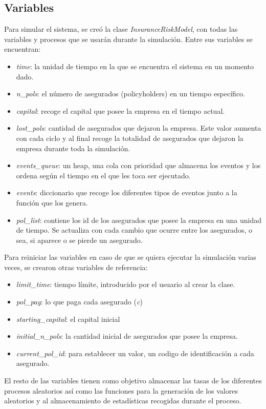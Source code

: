 \documentclass[spanish]{article}
\begin{document}
\subsection{Variables}
Para simular el sistema, se cre\'o la clase \textit{InsuranceRiskModel}, con todas las variables y procesos que se usar\'an durante la simulaci\'on.
Entre sus variables se encuentran:
\begin{itemize}
    \item \textit{time}: la unidad de tiempo en la que se encuentra el sistema en un momento dado.
    \item \textit{n\_pols}: el n\'umero de asegurados (policyholders) en un tiempo espec\'ifico.
    \item \textit{capital}: recoge el capital que posee la empresa en el tiempo actual.
    \item \textit{lost\_pols}: cantidad de asegurados que dejaron la empresa. Este valor aumenta con cada ciclo y al final recoge la totalidad de asegurados que dejaron la empresa durante toda la simulaci\'on.
    \item \textit{events\_queue}: un heap, una cola con prioridad que almacena los eventos y los ordena seg\'un el tiempo en el que les toca ser ejecutado.
    \item \textit{events}: diccionario que recoge los diferentes tipos de eventos junto a la funci\'on que los genera.
    \item \textit{pol\_list}: contiene los id de los asegurados que posee la empresa en una unidad de tiempo. Se actualiza con cada cambio que ocurre entre los asegurados, o sea, si aparece o se pierde un asegurado.
\end{itemize}
Para reiniciar las variables en caso de que se quiera ejecutar la simulaci\'on varias veces, se crearon otras variables de referencia:
\begin{itemize}
    \item \textit{limit\_time}: tiempo l\'imite, introducido por el usuario al crear la clase.
    \item \textit{pol\_pay}: lo que paga cada asegurado (\textit{c})
    \item \textit{starting\_capital}: el capital inicial
    \item \textit{initial\_n\_pols}: la cantidad inicial de asegurados que posee la empresa.
    \item \textit{current\_pol\_id}: para establecer un valor, un codigo de identificaci\'on a cada asegurado. 
\end{itemize}
El resto de las variables tienen como objetivo almacenar las tasas de los diferentes procesos aleatorios as\'i como las funciones para la generaci\'on de los valores aleatorios y al almacenamiento de estad\'isticas recogidas durante el proceso.
\end{document}
